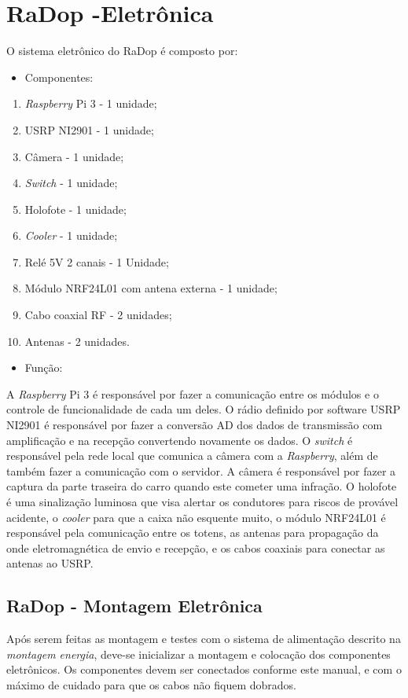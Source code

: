 \section{RaDop -Eletrônica}
O sistema eletrônico do RaDop é composto por:

\begin{itemize}
         \item Componentes:
         \end{itemize}
         \begin{enumerate}
    \item \emph{Raspberry} Pi 3 - 1 unidade; 
    \item USRP NI2901 - 1 unidade;
    \item Câmera - 1 unidade;
    \item \emph{Switch} - 1 unidade;
    \item Holofote - 1 unidade;
    \item \emph{Cooler} - 1 unidade;
    \item Relé 5V 2 canais - 1 Unidade;
    \item Módulo NRF24L01 com antena externa - 1 unidade;
    \item Cabo coaxial RF - 2 unidades;
    \item Antenas - 2 unidades.
    \end{enumerate}

\begin{itemize}
       \item Função:
\end{itemize}

A \emph{Raspberry} Pi 3 é responsável por fazer a comunicação entre os módulos e o controle de funcionalidade de cada um deles. O rádio definido por software USRP NI2901 é responsável por fazer a conversão AD dos dados de transmissão com amplificação e na recepção convertendo novamente os dados.  O \emph{switch} é responsável pela rede local que comunica a câmera com a \emph{Raspberry}, além de também fazer a comunicação com o servidor. A câmera é responsável por fazer a captura da parte traseira do carro quando este cometer uma infração. O holofote é uma sinalização luminosa que visa alertar os condutores para riscos de provável acidente, o \emph{cooler} para que a caixa não esquente muito, o módulo NRF24L01 é responsável pela comunicação entre os totens, as antenas para propagação da onde eletromagnética de envio e recepção, e os cabos coaxiais para conectar as antenas ao USRP.

  \subsection{RaDop - Montagem Eletrônica}
  Após serem feitas as montagem e testes com o sistema de alimentação descrito na \emph{montagem energia}, deve-se inicializar a montagem e colocação dos componentes eletrônicos. Os componentes devem ser conectados conforme este manual, e com o máximo de cuidado para que os cabos não fiquem dobrados.
  
